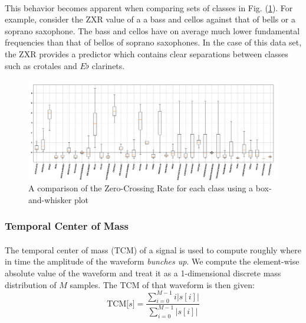 \documentclass[12pt,letterpaper]{article}
\begin{document}
\paragraph*{}This behavior becomes apparent when comparing sets of classes in Fig. (\ref{fig-FeatureZXR}). For example, consider the ZXR value of a a bass and cellos against that of bells or a soprano saxophone. The bass and cellos have on average much lower fundamental frequencies than that of bellos of soprano saxophones. In the case of this data set, the ZXR provides a predictor which contains clear separations between classes such as crotales and $E\flat$ clarinets. 
\begin{figure}[H]
\begin{center}
\includegraphics[scale=0.3]{../FiguresFeatures/ZXR}
\end{center}
\caption{A comparison of the Zero-Crossing Rate for each class using a box-and-whisker plot}
\label{fig-FeatureZXR}
\end{figure}


\subsubsection{Temporal Center of Mass}

\paragraph*{}The temporal center of mass (TCM) of a signal is used to compute roughly where in time the amplitude of the waveform \textit{bunches up}. We compute the element-wise absolute value of the waveform and treat it as a 1-dimensional discrete mass distribution of $M$ samples.
The TCM of that waveform is then given:
\begin{equation}
\label{eqn-FeatureTCM}
\text{TCM}\big[ s \big] = \frac{\sum_{i=0}^{M-1}i \big|s[i]\big|}
{\sum_{i=0}^{M-1}\big|s[i]\big|}
\end{equation}
\end{document}
